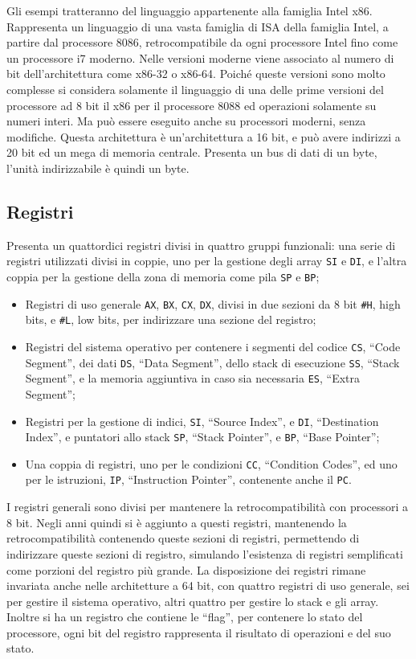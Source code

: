 \documentclass{article}
\numberwithin{equation}{subsection}
\begin{document}
Gli esempi tratteranno del linguaggio appartenente alla famiglia Intel x86. Rappresenta un linguaggio di una vasta famiglia di ISA della famiglia Intel, a partire dal 
processore 8086, retrocompatibile da ogni processore Intel fino come un processore i7 moderno. 
Nelle versioni moderne viene associato al numero di bit dell'architettura come x86-32 o x86-64. 
Poiché queste versioni sono molto complesse si considera solamente il linguaggio di una delle prime versioni del processore ad 8 bit il x86 per il processore 8088 ed operazioni 
solamente su numeri interi. 
Ma può essere eseguito anche su processori moderni, senza modifiche. 
Questa architettura è un'architettura a 16 bit, e può avere indirizzi a 20 bit ed un mega di memoria centrale. Presenta un bus di dati di un byte, l'unità indirizzabile è quindi 
un byte. 

\subsection{Registri}

Presenta un quattordici registri divisi in quattro gruppi funzionali:   una serie di registri utilizzati divisi in coppie, uno per la 
gestione degli array \verb|SI| e \verb|DI|, e l'altra coppia per la gestione della zona di memoria come pila \verb|SP| e \verb|BP|; 
\begin{itemize}
    \item Registri di uso generale \verb|AX|, \verb|BX|, \verb|CX|, \verb|DX|, divisi in due sezioni da 8 bit \verb|#H|, high bits, e \verb|#L|, low bits, per indirizzare una sezione del registro;
    \item Registri del sistema operativo per contenere i segmenti del codice \verb|CS|, ``Code Segment'', dei dati \verb|DS|, ``Data Segment'', dello stack di esecuzione \verb|SS|, ``Stack Segment'',  e la memoria aggiuntiva in caso sia necessaria \verb|ES|, ``Extra Segment'';
    \item Registri per la gestione di indici, \verb|SI|, ``Source Index'', e \verb|DI|, ``Destination Index'', e puntatori allo stack \verb|SP|, ``Stack Pointer'', e \verb|BP|, ``Base Pointer'';
    \item Una coppia di registri, uno per le condizioni \verb|CC|, ``Condition Codes'', ed uno per le istruzioni, \verb|IP|, ``Instruction Pointer'', contenente anche il \verb|PC|. 
\end{itemize}

I registri generali sono divisi per mantenere la retrocompatibilità con processori a 8 bit. 
Negli anni quindi si è aggiunto a questi registri, mantenendo la retrocompatibilità contenendo queste sezioni di registri, permettendo di indirizzare queste sezioni di 
registro, simulando l'esistenza di registri semplificati come porzioni del registro più grande. 
La disposizione dei registri rimane invariata anche nelle architetture a 64 bit, con quattro registri di uso generale, sei per gestire il sistema operativo, altri quattro per 
gestire lo stack e gli array. Inoltre si ha un registro che contiene le ``flag'', per contenere lo stato del processore, ogni bit del registro rappresenta il risultato 
di operazioni e del suo stato. 
\end{document}
